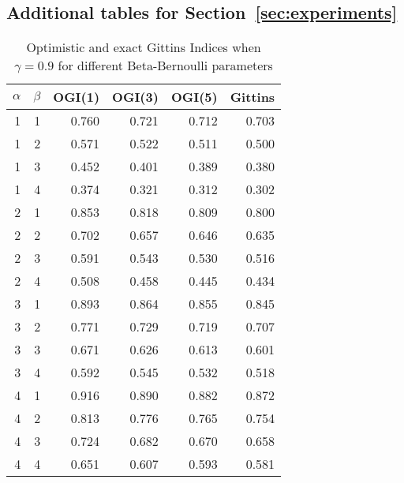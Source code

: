 \subsection{Additional tables for Section~\ref{sec:experiments}}
\begin{table}
	\centering
	\begin{tabular}{rrrrrr} 
		\toprule
		{}    $\alpha$ &   $\beta$ &  OGI(1) &  OGI(3) &  OGI(5) &  Gittins \\
		\midrule
		   1 & 1 &   0.760 &   0.721 &   0.712 &    0.703 \\
		   1 & 2 &   0.571 &   0.522 &   0.511 &    0.500 \\
		   1 & 3 &   0.452 &   0.401 &   0.389 &    0.380 \\
		   1 & 4 &   0.374 &   0.321 &   0.312 &    0.302 \\
		  2 & 1 &   0.853 &   0.818 &   0.809 &    0.800 \\
		  2 & 2 &   0.702 &   0.657 &   0.646 &    0.635 \\
		  2 & 3 &   0.591 &   0.543 &   0.530 &    0.516 \\
		  2 & 4 &   0.508 &   0.458 &   0.445 &    0.434 \\
		  3 & 1 &   0.893 &   0.864 &   0.855 &    0.845 \\
		  3 & 2 &   0.771 &   0.729 &   0.719 &    0.707 \\
		  3 & 3 &   0.671 &   0.626 &   0.613 &    0.601 \\
		  3 & 4 &   0.592 &   0.545 &   0.532 &    0.518 \\
		 4 & 1 &   0.916 &   0.890 &   0.882 &    0.872 \\
		  4 & 2 &   0.813 &   0.776 &   0.765 &    0.754 \\
		  4 & 3 &   0.724 &   0.682 &   0.670 &    0.658 \\
		  4 & 4 &   0.651 &   0.607 &   0.593 &    0.581 \\
		\bottomrule
	\end{tabular}
	\caption{Optimistic and exact Gittins Indices when $\gamma = 0.9$ for different Beta-Bernoulli parameters}
	\label{table:ogi_table_for_gamma_9}
\end{table}


